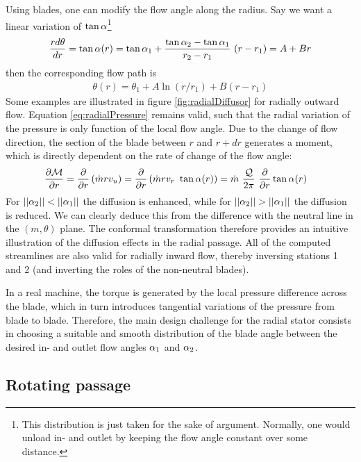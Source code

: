 Using blades, one can modify the flow angle along the radius. Say we
want a linear variation of $\tan \alpha$\footnote{This
  distribution is just taken for the sake of argument. Normally, one
  would unload in- and outlet by keeping the flow angle constant over
  some distance.}
\begin{align*}
  \frac{r d\theta}{dr} = \tan \alpha(r) = \tan \alpha_1 + \frac{\tan
    \alpha_2 - \tan \alpha_1}{r_2 - r_1} ~(r-r_1) = A + B r
\end{align*}
then the corresponding flow path is 
\begin{align*}
  \theta(r) = \theta_1 + A \ln (r/r_1) + B (r - r_1)
\end{align*}
Some examples are illustrated in figure \ref{fig:radialDiffusor} for
radially outward flow. Equation \ref{eq:radialPressure} remains valid,
such that the radial variation of the pressure is only function of the
local flow angle.  Due to the change of flow direction, the section of
the blade between $r$ and $r+dr$ generates a moment, which is directly
dependent on the rate of change of the flow angle:
\begin{align*}
  \frac{\partial \mathcal M}{\partial r} 
  &= \frac{\partial }{\partial r} \left(\dot m r v_{u}\right) 
  = \frac{\partial }{\partial r} \left(\dot m r v_r ~\tan \alpha(r)\right) 
  = \dot m~\frac{\mathcal Q}{2 \pi}~\frac{\partial }{\partial r} \tan \alpha(r) 
\end{align*}
For $||\alpha_2|| < ||\alpha_1||$ the diffusion is enhanced,
while for $||\alpha_2|| > || \alpha_1||$ the diffusion is
reduced. We can clearly deduce this from the difference with the
neutral line in the $(m,\theta)$ plane. The conformal transformation
therefore provides an intuitive illustration of the diffusion effects
in the radial passage. All of the computed streamlines are also valid
for radially inward flow, thereby inversing stations 1 and 2 (and
inverting the roles of the non-neutral blades).

In a real machine, the torque is generated by the local pressure
difference across the blade, which in turn introduces tangential
variations of the pressure from blade to blade. Therefore, the main
design challenge for the radial stator consists in choosing a suitable
and smooth distribution of the blade angle between the desired in- and
outlet flow angles $\alpha_1$ and $\alpha_2$.

\subsection{Rotating passage}

